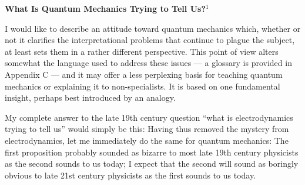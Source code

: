 \vfil\eject

\centerline{{\bf What Is Quantum Mechanics Trying to Tell Us?}$^1$}
\bigskip





\bigskip
{}
\medskip

I would like to describe an attitude toward quantum mechanics which,
whether or not it clarifies the interpretational problems that
continue to plague the subject, at least sets them in a rather
different perspective.  This point of view alters somewhat the
language used to address these issues --- a glossary is provided in
Appendix C --- and it may offer a less perplexing basis for teaching
quantum mechanics or explaining it to non-specialists.  It is based on
one fundamental insight, perhaps best introduced by an analogy.

My complete answer to the late 19th century question ``what is
electrodynamics trying to tell us'' would simply be this: 
\ni Having thus removed the mystery from electrodynamics, let me immediately
do the same for quantum mechanics: 
\ni The first proposition probably sounded as bizarre to most late
19th century physicists as the second sounds to us today; I expect
that the second will sound as boringly obvious to late 21st century
physicists as the first sounds to us today.  

